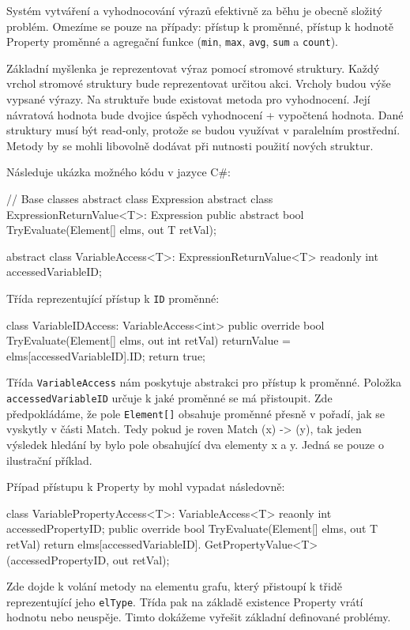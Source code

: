 Systém vytváření a vyhodnocování výrazů efektivně za běhu je obecně složitý problém.
Omezíme se pouze na případy: přístup k proměnné, přístup k hodnotě Property proměnné a agregační funkce (\verb+min+, \verb+max+, \verb+avg+, \verb+sum+ a \verb+count+).

Základní myšlenka je reprezentovat výraz pomocí stromové struktury. 
Každý vrchol stromové struktury bude reprezentovat určitou akci.
Vrcholy budou výše vypsané výrazy. 
Na struktuře bude existovat metoda pro vyhodnocení.
Její návratová hodnota bude dvojice úspěch vyhodnocení + vypočtená hodnota. 
Dané struktury musí být read-only, protože se budou využívat v paralelním prostřední.
Metody by se mohli libovolně dodávat při nutnosti použití nových struktur. 

Následuje ukázka možného kódu v jazyce C\#:
\begin{code}
// Base classes
abstract class Expression { }
abstract class ExpressionReturnValue<T>: Expression {
  public abstract bool TryEvaluate(Element[] elms, out T retVal); 
}

abstract class VariableAccess<T>: ExpressionReturnValue<T> {
     readonly int accessedVariableID; 
}
\end{code}
\clearpage 
Třída reprezentující přístup k \verb+ID+ proměnné:
\begin{code}
class VariableIDAccess: VariableAccess<int> {
  public override bool TryEvaluate(Element[] elms, out int retVal) {
     returnValue = elms[accessedVariableID].ID;
     return true; 
  }
}
\end{code}
Třída \verb+VariableAccess+ nám poskytuje abstrakci pro přístup k proměnné.
Položka \verb+accessedVariableID+ určuje k jaké proměnné se má přistoupit.
Zde předpokládáme, že pole \verb+Element[]+ obsahuje proměnné přesně v pořadí, jak se vyskytly v části Match.
Tedy pokud je roven Match (x) -> (y), tak jeden výsledek hledání by bylo pole obsahující dva elementy x a y.
Jedná se pouze o ilustrační příklad. 

Případ přístupu k Property by mohl vypadat následovně:
\begin{code}
class VariablePropertyAccess<T>: VariableAccess<T> {
  reaonly int accessedPropertyID; 
  public override bool TryEvaluate(Element[] elms, out T retVal) {
    return elms[accessedVariableID].
               GetPropertyValue<T>(accessedPropertyID, out retVal);
  }
}
\end{code}
Zde dojde k volání metody na elementu grafu, který přistoupí k třidě reprezentující jeho \verb+elType+.
Třída pak na základě existence Property vrátí hodnotu nebo neuspěje.
Timto dokážeme vyřešit základní definované problémy.

